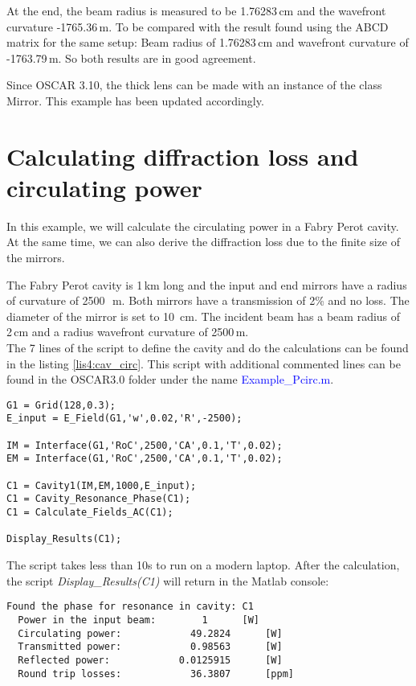 At the end, the beam radius is measured to be 1.76283\,cm and the wavefront curvature -1765.36\,m. To be compared with the result found using the ABCD matrix for the same setup: Beam radius of 1.76283\,cm and wavefront curvature of -1763.79\,m. So both results are in good agreement.

Since OSCAR 3.10, the thick lens can be made with an instance of the class Mirror. This example has been updated accordingly.

\section{Calculating diffraction loss and circulating power}

In this example, we will calculate the circulating power in a Fabry Perot cavity. At the same time, we can also derive the diffraction loss due to the finite size of the mirrors.

The Fabry Perot cavity is 1\,km long and the input and end mirrors have a radius of curvature of 2500~\,m. Both mirrors have a transmission of 2\% and no loss. The diameter of the mirror is set to 10~cm. The incident beam has a beam radius of 2\,cm and a radius wavefront curvature of 2500\,m.\\

The 7 lines of the script to define the cavity and do the calculations can be found in the listing \ref{lis4:cav_circ}. This script with additional commented lines can be found in the OSCAR3.0 folder under the name \textcolor{blue}{Example\_Pcirc.m}.

\begin{lstlisting}[float=htp,caption=Example of OSCAR script to calculate the circulating power\label{lis4:cav_circ},frame=lines]
G1 = Grid(128,0.3);
E_input = E_Field(G1,'w',0.02,'R',-2500);

IM = Interface(G1,'RoC',2500,'CA',0.1,'T',0.02);
EM = Interface(G1,'RoC',2500,'CA',0.1,'T',0.02);

C1 = Cavity1(IM,EM,1000,E_input);
C1 = Cavity_Resonance_Phase(C1);
C1 = Calculate_Fields_AC(C1);

Display_Results(C1);
\end{lstlisting}

The script takes less than 10s to run on a modern laptop. After the calculation, the script \emph{Display\_Results(C1)} will return in the Matlab console:

\newpage

\begin{verbatim}
Found the phase for resonance in cavity: C1
  Power in the input beam: 	      1 	 [W]
  Circulating power: 		    49.2824 	 [W]
  Transmitted power: 		    0.98563 	 [W]
  Reflected power: 			  0.0125915 	 [W]
  Round trip losses: 		    36.3807 	 [ppm]
\end{verbatim}



